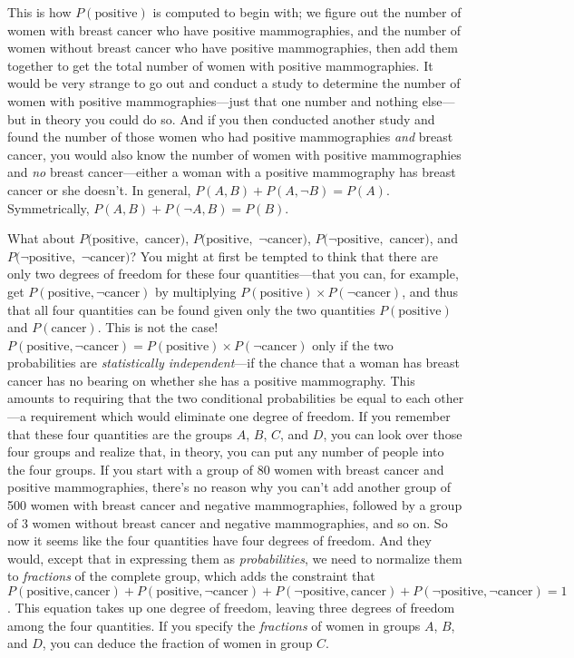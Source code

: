 {{{
 This is how $P(\text{positive})$ is computed to begin with; we figure out
the number of women with breast cancer who have positive mammographies,
and the number of women without breast cancer who have positive
mammographies, then add them together to get the total number of women
with positive mammographies. It would be very strange to go out and
conduct a study to determine the number of women with positive
mammographies---just that one number and nothing else---but in theory
you could do so. And if you then conducted another study and found the
number of those women who had positive mammographies \textit{and}
breast cancer, you would also know the number of women with positive
mammographies and \textit{no} breast cancer---either a woman with a
positive mammography has breast cancer or she doesn't.
In general, $P(A,B) + P(A,\lnot B) = P(A)$. Symmetrically, $P(A,B) +
P(\lnot A,B) = P(B)$.}

{
 What about $P(\text{positive},$ $\text{cancer})$, $P(\text{positive},$ $\lnot\text{cancer})$,
$P(\lnot\text{positive},$ $\text{cancer})$, and
$P(\lnot\text{positive},$ $\lnot\text{cancer})$? You might at first be tempted
to think that there are only two degrees of freedom for these four
quantities---that you can, for example, get
$P(\text{positive},\lnot\text{cancer})$ by multiplying $P(\text{positive}) \times
P(\lnot\text{cancer})$, and thus that all four quantities can be found
given only the two quantities $P(\text{positive})$ and $P(\text{cancer})$. This is not
the case! $P(\text{positive},\lnot\text{cancer}) = P(\text{positive}) \times
P(\lnot\text{cancer})$ only if the two probabilities are
\textit{statistically independent}{}---if the chance that a woman has
breast cancer has no bearing on whether she has a positive mammography.
This amounts to requiring that the two conditional probabilities be
equal to each other---a requirement which would eliminate one degree of
freedom. If you remember that these four quantities are the groups $A$,
$B$, $C$, and $D$, you can look over those four groups and realize that, in
theory, you can put any number of people into the four groups. If you
start with a group of 80 women with breast cancer and positive
mammographies, there's no reason why you
can't add another group of 500 women with breast cancer
and negative mammographies, followed by a group of 3 women without
breast cancer and negative mammographies, and so on. So now it seems
like the four quantities have four degrees of freedom. And they would,
except that in expressing them as \textit{probabilities}, we need to
normalize them to \textit{fractions} of the complete group, which adds
the constraint that $P(\text{positive},
\text{cancer})+P(\text{positive},\lnot\text{cancer})+P(\lnot\text{positive},
\text{cancer})+P(\lnot\text{positive},\lnot\text{cancer}) = 1$. This equation
takes up one degree of freedom, leaving three degrees of freedom among
the four quantities. If you specify the \textit{fractions} of women in
groups $A$, $B$, and $D$, you can deduce the fraction of women in group $C$.}

}}
